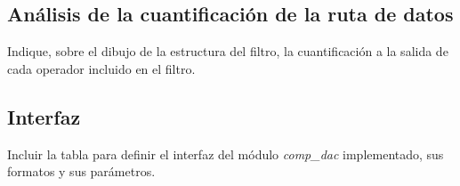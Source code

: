 \documentclass[parskip,a4paper,12pt]{article}
\newcommand{\fila}{}
\begin{document}
\subsection{Análisis de la cuantificación de la ruta de datos}
\begin{enunciado}{}{}%
Indique, sobre el dibujo de la estructura del filtro, la cuantificación a la salida de cada operador incluido en el filtro.
\end{enunciado}

\subsection{Interfaz}

\begin{enunciado}{}{}%
Incluir la tabla para definir el interfaz del módulo \emph{comp\_dac} implementado, sus formatos y sus parámetros. 
\end{enunciado}

\def\colUNO{2cm}
\def\colDOS{1cm}
\def\colTRES{2.0cm}
\def\colCUATRO{10cm}

\begin{table}[H]
    \caption{Interfaz del módulo  \emph{comp\_dac}}
    \label{tab:interfaz}
\gdef\cabecera{\fila{NOMBRE}{TIPO}{FORMATO}{DESCRIPCIÓN}}
\noindent\begin{mitabla}
\fila{}{}{}{} 
\fila{}{}{}{} 
\fila{}{}{}{} 
\fila{}{}{}{} 
\fila{}{}{}{} 
\fila{}{}{}{} 
\fila{}{}{}{} 
\fila{}{}{}{} 
\fila{}{}{}{} 
\fila{}{}{}{} 
\end{mitabla}
\end{table}


\end{document}
